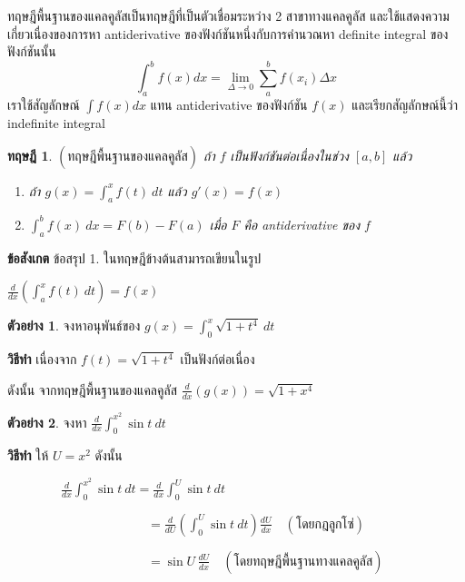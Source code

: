 \documentclass[
]{book}
\newtheorem{theorem}{ทฤษฎี}[chapter]
\theoremstyle{definition}
\theoremstyle{definition}
\newtheorem{example}{ตัวอย่าง}[chapter]
\theoremstyle{definition}
\theoremstyle{definition}
\theoremstyle{remark}
\begin{document}
ทฤษฎีพื้นฐานของแคลคูลัสเป็นทฤษฎีที่เป็นตัวเชื่อมระหว่าง 2 สาขาทางแคลคูลัส
และใช้แสดงความเกี่ยวเนื่องของการหา antiderivative ของฟังก์ชันหนึ่งกับการคำนวณหา
definite integral ของฟังก์ชันนั้น
\[\int^b_af(x)dx= \lim\limits_{\Delta\rightarrow 0}\sum_a^bf(x_i)\Delta x\]
เราใช้สัญลักษณ์ \(\int f(x)dx\) แทน antiderivative ของฟังก์ชัน \(f(x)\)
และเรียกสัญลักษณ์นี้ว่า indefinite integral

\begin{theorem}

\(( \mbox{ทฤษฎีพื้นฐานของแคลคูลัส})\) ถ้า \(f\) เป็นฟังก์ชันต่อเนื่องในช่วง \([a,b]\) แล้ว

\begin{enumerate}
\def\labelenumi{\arabic{enumi}.}
\item
  ถ้า \(\displaystyle g(x)=\int_{a}^{x}f(t) \ dt\) แล้ว \(g'(x)=f(x)\)
\item
  \(\displaystyle \int_{a}^{b}f(x) \ dx=F(b)-F(a)\) เมื่อ \(F\) คือ
  antiderivative ของ \(f\)
\end{enumerate}

\end{theorem}

\textbf{ข้อสังเกต} ข้อสรุป 1. ในทฤษฎีข้างต้นสามารถเขียนในรูป

\(\displaystyle \frac{d}{dx}\left(\int_{a}^{x}f(t) \ dt\right)=f(x)\)

\begin{example}
จงหาอนุพันธ์ของ \(\displaystyle
g(x)=\int_{0}^{x}\sqrt{1+t^{4}} \ dt\)
\end{example}

\textbf{วิธีทำ} เนื่องจาก \(\displaystyle f(t)=\sqrt{1+t^{4}}\) เป็นฟังก์ต่อเนื่อง

ดังนั้น จากทฤษฎีพื้นฐานของแคลคูลัส \(\displaystyle
\frac{d}{dx}\left(g(x)\right)=\sqrt{1+x^{4}}\)

\begin{example}
จงหา \(\displaystyle \frac{d}{dx}\int_{0}^{x^{2}}\sin t \ dt\)
\end{example}

\textbf{วิธีทำ} ให้ \(U=x^{2}\) ดังนั้น

\(\qquad \qquad \ \displaystyle \frac{d}{dx}\int_{0}^{x^{2}}\sin t \ dt
=\frac{d}{dx}\int_{0}^{U}\sin t \ dt\)

\(\qquad \qquad \qquad \qquad \qquad \quad =\displaystyle
\frac{d}{dU}\left(\int_{0}^{U}\sin t \ dt\right) \frac{dU}{dx} \quad (
\mbox{โดยกฎลูกโซ่})\)

\(\qquad \qquad \qquad \qquad \qquad \quad =\displaystyle \sin U \,
\frac{dU}{dx} \quad ( \mbox{โดยทฤษฎีพื้นฐานทางแคลคูลัส} )\)
\end{document}
